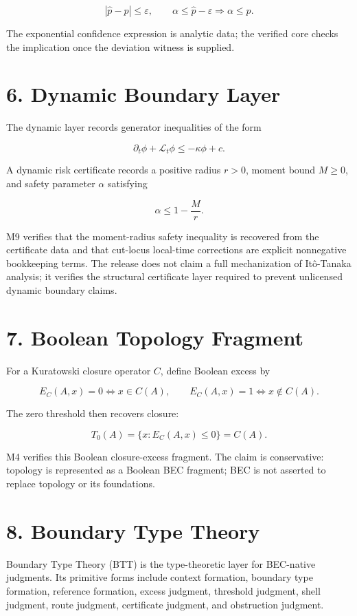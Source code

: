 \documentclass[
  11pt,
]{article}
\begin{document}
\[
|\widehat p-p|\le\varepsilon,
\qquad \alpha\le \widehat p-\varepsilon
\Rightarrow
\alpha\le p.
\]

The exponential confidence expression is analytic data; the verified
core checks the implication once the deviation witness is supplied.

\section{6. Dynamic Boundary Layer}\label{dynamic-boundary-layer}

The dynamic layer records generator inequalities of the form

\[
\partial_t\phi+\mathcal L_t\phi\le -\kappa\phi+c.
\]

A dynamic risk certificate records a positive radius \(r>0\), moment
bound \(M\ge 0\), and safety parameter \(\alpha\) satisfying

\[
\alpha\le 1-\frac{M}{r}.
\]

M9 verifies that the moment-radius safety inequality is recovered from
the certificate data and that cut-locus local-time corrections are
explicit nonnegative bookkeeping terms. The release does not claim a
full mechanization of Itô-Tanaka analysis; it verifies the structural
certificate layer required to prevent unlicensed dynamic boundary
claims.

\section{7. Boolean Topology Fragment}\label{boolean-topology-fragment}

For a Kuratowski closure operator \(C\), define Boolean excess by

\[
E_C(A,x)=0 \iff x\in C(A),
\qquad
E_C(A,x)=1 \iff x\notin C(A).
\]

The zero threshold then recovers closure:

\[
T_0(A)=\{x:E_C(A,x)\le 0\}=C(A).
\]

M4 verifies this Boolean closure-excess fragment. The claim is
conservative: topology is represented as a Boolean BEC fragment; BEC is
not asserted to replace topology or its foundations.

\section{8. Boundary Type Theory}\label{boundary-type-theory}

Boundary Type Theory (BTT) is the type-theoretic layer for BEC-native
judgments. Its primitive forms include context formation, boundary type
formation, reference formation, excess judgment, threshold judgment,
shell judgment, route judgment, certificate judgment, and obstruction
judgment.
\end{document}
